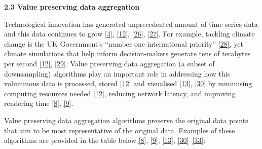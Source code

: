 \documentclass{article}
\begin{document}
\textbf{2.3 Value preserving data aggregation}

Technological innovation has generated unprecedented amount of time
series data and this data continues to grow
\protect\hyperlink{ref-data2020}{{[}4{]}},
\protect\hyperlink{ref-TVStore}{{[}12{]}},
\protect\hyperlink{ref-storage}{{[}26{]}},
\protect\hyperlink{ref-CatchUp}{{[}27{]}}. For example, tackling climate
change is the UK Government's ``number one international priority''
\protect\hyperlink{ref-IR}{{[}28{]}}, yet climate simulations that help
inform decision-makers generate tens of terabytes per second
\protect\hyperlink{ref-TVStore}{{[}12{]}},
\protect\hyperlink{ref-climate}{{[}29{]}}. Value preserving data
aggregation (a subset of downsampling) algorithms play an important role
in addressing how this voluminous data is processed, stored
\protect\hyperlink{ref-TVStore}{{[}12{]}} and visualised
\protect\hyperlink{ref-Sveinn}{{[}13{]}},
\protect\hyperlink{ref-dashql}{{[}30{]}} by minimising computing
resources needed \protect\hyperlink{ref-TVStore}{{[}12{]}}, reducing
network latency, and improving rendering time
\protect\hyperlink{ref-datapoint}{{[}8{]}},
\protect\hyperlink{ref-MinMaxLTTB}{{[}9{]}}.

Value preserving data aggregation algorithms preserve the original data
points that aim to be most representative of the original data. Examples
of these algorithms are provided in the table below
\protect\hyperlink{ref-datapoint}{{[}8{]}},
\protect\hyperlink{ref-MinMaxLTTB}{{[}9{]}},
\protect\hyperlink{ref-Sveinn}{{[}13{]}},
\protect\hyperlink{ref-dashql}{{[}30{]}}--\protect\hyperlink{ref-M4}{{[}33{]}}:
\end{document}
